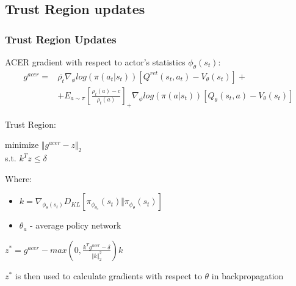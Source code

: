 \documentclass{beamer}
\begin{document}
\subsection{Trust Region updates}
\begin{frame}
\frametitle{Trust Region Updates}
ACER gradient with respect to actor's statistics $\phi_\theta(s_t)$:\\
\begin{align*}
g^{acer} = & \overline{\rho_t}\nabla_\phi log(\pi(a_t|s_t)) \left[ Q^{ret} (s_t,a_t) - V_\theta(s_t) \right] + \\
			& + E_{a \sim \pi} \left[ \frac{\rho_t(a) - c}{\rho_t(a)} \right]_+ \nabla_\phi log(\pi(a|s_t)) [Q_\theta (s_t, a) - V_\theta (s_t)]
\end{align*}

Trust Region:\\

\begin{center}
minimize $\Vert g^{acer} - z \Vert_2$\\
s.t. $k^T z \leq \delta$
\end{center}
\vspace{3mm}
Where:
\begin{itemize}
\item $k = \nabla_{\phi_\theta (s_t)} D_{KL} \left[ \pi_{\phi_{\theta_a}} (s_t) \Vert \pi_{\phi_\theta} (s_t) \right]$\\
\item $\theta_a$ - average policy network
\end{itemize}


\vspace{3mm}
$z^* = g^{acer} - max \left( 0, \frac{k^T g^{acer} - \delta}{\Vert k \Vert_2^2} \right) k$

$z^*$ is then used to calculate gradients with respect to $\theta$ in backpropagation


\end{frame}
\end{document}
